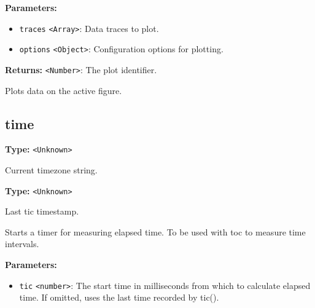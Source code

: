 \documentclass[12pt,a4paper]{article}
\begin{document}
\vspace{5mm}
\noindent {}


\noindent \textbf{Parameters:}
\begin{itemize}
  \item \texttt{traces} \texttt{<Array>}: Data traces to plot.
  \item \texttt{options} \texttt{<Object>}: Configuration options for plotting.
\end{itemize}

\noindent \textbf{Returns:} \texttt{<Number>}: The plot identifier.

\noindent Plots data on the active figure.


\subsection{time}
\vspace{5mm}
\noindent {}\vspace{4mm}


\noindent \textbf{Type:} \texttt{<Unknown>}

\noindent Current timezone string.

\vspace{5mm}
\noindent {}\vspace{4mm}


\noindent \textbf{Type:} \texttt{<Unknown>}

\noindent Last tic timestamp.

\vspace{5mm}
\noindent {}


\noindent Starts a timer for measuring elapsed time. To be used with \textasciigrave{}toc\textasciigrave{} to measure time intervals.

\vspace{5mm}
\noindent {}


\noindent \textbf{Parameters:}
\begin{itemize}
  \item \texttt{tic} \texttt{<number>}: The start time in milliseconds from which to calculate elapsed time. If omitted, uses the last time recorded by \textasciigrave{}tic()\textasciigrave{}.
\end{itemize}
\end{document}
